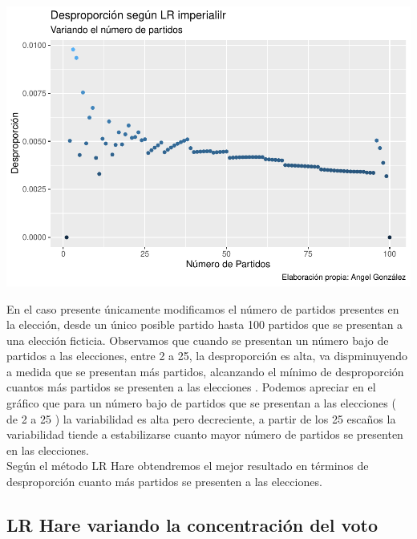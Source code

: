 \documentclass[12pt,a4paper,]{book}
\numberwithin{dummy}{section}
\theoremstyle{ocrenumbox}
\theoremstyle{blacknumex}
\theoremstyle{blacknumbox}
\theoremstyle{ocrenum}
\theoremstyle{ocrenum}
\begin{document}
\begin{center}\includegraphics[width=0.95\linewidth]{figurasR/unnamed-chunk-52-1} \end{center}

En el caso presente únicamente modificamos el número de partidos
presentes en la elección, desde un único posible partido hasta 100
partidos que se presentan a una elección ficticia. Observamos que cuando
se presentan un número bajo de partidos a las elecciones, entre 2 a 25,
la desproporción es alta, va dispminuyendo a medida que se presentan más
partidos, alcanzando el mínimo de desproporción cuantos más partidos se
presenten a las elecciones . Podemos apreciar en el gráfico que para un
número bajo de partidos que se presentan a las elecciones ( de 2 a 25 )
la variabilidad es alta pero decreciente, a partir de los 25 escaños la
variabilidad tiende a estabilizarse cuanto mayor número de partidos se
presenten en las elecciones.\\
Según el método LR Hare obtendremos el mejor resultado en términos de
desproporción cuanto más partidos se presenten a las elecciones.

\hypertarget{lr-hare-variando-la-concentraciuxf3n-del-voto}{%
\subsection{LR Hare variando la concentración del
voto}\label{lr-hare-variando-la-concentraciuxf3n-del-voto}}
\end{document}
